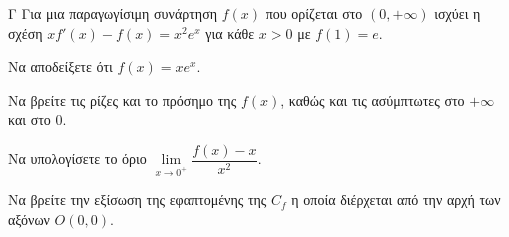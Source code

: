 \begin{thema}{Γ}
Για μια παραγωγίσιμη συνάρτηση $f(x)$ που ορίζεται στο $(0, +\infty)$ ισχύει η σχέση $x f'(x) - f(x) = x^2 e^x$ για κάθε $x > 0$ με $f(1) = e$.
\begin{erwthma}
  \item Να αποδείξετε ότι $f(x) = x e^x$.
  \item Να βρείτε τις ρίζες και το πρόσημο της $f(x)$, καθώς και τις ασύμπτωτες στο $+\infty$ και στο $0$.
  \item Να υπολογίσετε το όριο $\lim\limits_{x \to 0^+} \dfrac{f(x) - x}{x^2}$.
  \item Να βρείτε την εξίσωση της εφαπτομένης της $C_f$ η οποία διέρχεται από την αρχή των αξόνων $O(0,0)$.
\end{erwthma}
\end{thema}
